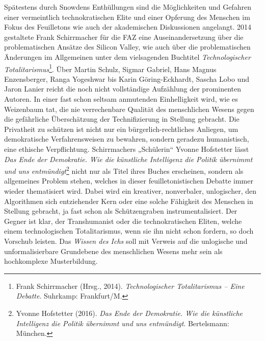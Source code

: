 \documentclass[a4paper,11pt]{article}
\begin{document}
Spätestens durch Snowdens Enthüllungen sind die Möglichkeiten und Gefahren
einer vermeintlich technokratischen Elite und einer Opferung des Menschen im
Fokus des Feuilletons wie auch der akademischen Diskussionen angelangt. 2014
gestaltete Frank Schirrmacher für die FAZ eine Auseinandersetzung über die
problematischen Ansätze des Silicon Valley, wie auch über die problematischen
Änderungen im Allgemeinen unter dem vielsagenden Buchtitel
\emph{Technologischer Totalitarismus}\footnote{Frank Schirrmacher (Hrsg.,
  2014). \emph{Technologischer Totalitarismus -- Eine Debatte}.  Suhrkamp:
  Frankfurt/M. }. Über Martin Schulz, Sigmar Gabriel, Hans Magnus
Enzensberger, Ranga Yogeshwar bis Karin Göring-Eckhardt, Sascha Lobo und Jaron
Lanier reicht die noch nicht vollständige Aufzählung der prominenten Autoren.
In einer fast schon seltsam anmutenden Einhelligkeit wird, wie es Weizenbaum
tat, die nie verrechenbare Qualität des menschlichen Wesens gegen die
gefährliche Überschätzung der Technifizierung in Stellung gebracht. Die
Privatheit zu schützen ist nicht nur ein bürgerlich-rechtliches Anliegen, um
demokratische Verfahrensweisen zu bewahren, sondern geradezu humanistisch,
eine ethische Verpflichtung.  Schirrmachers „Schülerin“ Yvonne Hofstetter
lässt \emph{Das Ende der Demokratie. Wie die künstliche Intelligenz die
  Politik übernimmt und uns entmündigt}\footnote{Yvonne Hofstetter (2016).
  \emph{Das Ende der Demokratie. Wie die künstliche Intelligenz die Politik
    übernimmt und uns entmündigt}. Bertelsmann: München. } nicht nur als Titel
ihres Buches erscheinen, sondern als allgemeines Problem stehen, welches in
dieser feuilletonistischen Debatte immer wieder thematisiert wird.  Dabei wird
ein kreativer, nonverbaler, unlogischer, den Algorithmen sich entziehender
Kern oder eine solche Fähigkeit des Menschen in Stellung gebracht, ja fast
schon als Schützengraben instrumentalisiert. Der Gegner ist klar, der
Transhumanist oder die technokratischen Eliten, welche einem technologischen
Totalitarismus, wenn sie ihn nicht schon fordern, so doch Vorschub
leisten. Das \emph{Wissen des Ichs} soll mit Verweis auf die unlogische und
unformalisierbare Grundebene des menschlichen Wesens mehr sein als
hochkomplexe Musterbildung.
\end{document}
